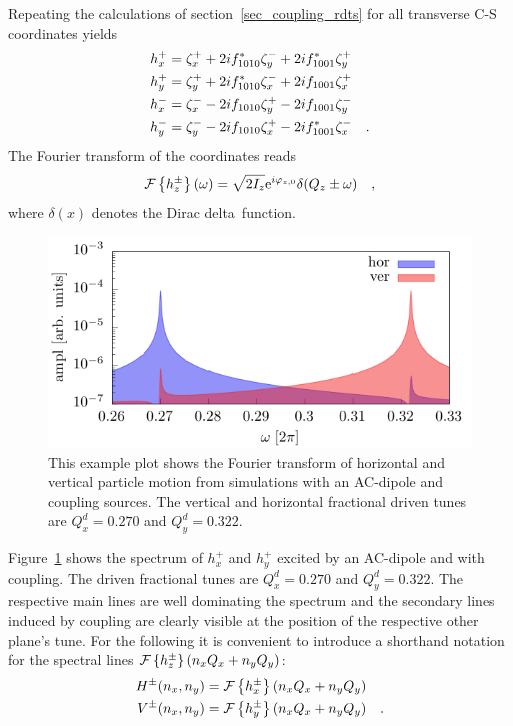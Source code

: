 Repeating the calculations of section~\ref{sec_coupling_rdts} for all transverse C-S coordinates yields
%
\begin{align}
    h_x^+ &= \zeta_x^+ + 2if_{1010}^* \zeta_y^- + 2if_{1001}^*\zeta_y^+  \notag\\  
    h_y^+ &= \zeta_y^+ + 2if_{1010}^* \zeta_x^- + 2i{f_{1001}}\zeta_x^+   \notag\\ 
    h_x^- &= \zeta_x^- - 2i{f_{1010}} \zeta_y^+ - 2i{f_{1001}}\zeta_y^-   \notag\\ 
    h_y^- &= \zeta_y^- - 2i{f_{1010}} \zeta_x^+ - 2if_{1001}^*\zeta_x^-    
    \quad .
    \label{eq_hxpm_hypm}
\end{align}
%
The Fourier transform of the coordinates reads
%
\begin{equation}
    \mathcal{F} \left\{ h_z^\pm \right\}(\omega) = \sqrt{2I_z}\text{e}^{i\varphi_{z,0}} \delta(Q_z \pm \omega)
    \quad ,
\end{equation}
%
where $\delta(x)$ denotes the Dirac delta~function.
\begin{figure}
    \centering
    \includegraphics[width=0.8\linewidth]{figures/spectrum_plot}
    \caption{
        This example plot shows the Fourier transform of horizontal and vertical particle motion
        from simulations with an AC-dipole and coupling sources. The vertical and horizontal fractional 
        driven tunes are $Q_x^d=0.270$ and $Q_y^d=0.322$.
    }
    \label{fig_cplx_spctr}
\end{figure}
Figure~\ref{fig_cplx_spctr} shows the spectrum of $h_x^+$ and $h_y^+$ excited by an AC-dipole and with coupling.
The driven fractional tunes are $Q_x^d=0.270$ and $Q_y^d=0.322$. The respective main lines are well dominating the spectrum
and the secondary lines induced by coupling are clearly visible at the position of the respective other plane's tune.
For the following it is convenient to introduce a shorthand notation for the spectral lines $\mathcal{F} \left\{ h_z^\pm \right\}(n_xQ_x+n_yQ_y)$:
%
\begin{align}
    H^\pm(n_x,n_y) &= \mathcal{F} \left\{ h_x^\pm \right\}(n_xQ_x+n_yQ_y) \notag\\
    V^\pm(n_x,n_y) &= \mathcal{F} \left\{ h_y^\pm \right\}(n_xQ_x+n_yQ_y) 
    \quad .
\end{align}
